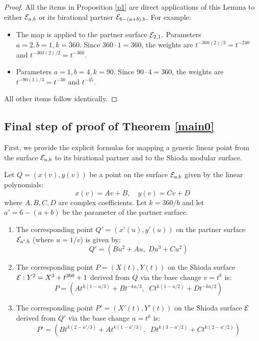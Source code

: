 \documentclass[11pt]{amsart}
\begin{document}
\begin{proof}
 All the items in Proposition \ref{p1} are direct applications of this Lemma to either ${\mathcal E}_{a,b}$ or its birational partner ${\mathcal E}_{6-(a+b),b}$. For example:
\begin{itemize}
	\item[(1)]   The map is applied to the partner surface ${\mathcal E}_{2,1}$. Parameters $a=2, b=1, k=360$. Since $360 \cdot 1 = 360$, the weights are $t^{-360(2)/3} = t^{-240}$ and $t^{-360(2)/2} = t^{-360}$.
		\item[(5)]   Parameters $a=1, b=4, k=90$. Since $90 \cdot 4 = 360$, the weights are $t^{-90(1)/3} = t^{-30}$ and $t^{-45}$.
\end{itemize}
All other items follow identically.
\end{proof}



 
\subsection{Final step of proof of Theorem \ref{main0}}


First, we provide the explicit formulas for mapping a generic linear point from the surface ${\mathcal E}_{a,b}$ to its birational partner and to the Shioda modular surface.

\begin{lema}
	\label{lem:linear_transform}
	Let $Q = (x(v), y(v))$ be a point on the surface ${\mathcal E}_{a,b}$ given by the linear polynomials:
	\[ x(v) = A v + B, \quad y(v) = C v + D \]
	where $A, B, C, D$ are complex coefficients. Let $k = 360/b$ and let $a' = 6-(a+b)$ be the parameter of the partner surface.
	
	\begin{enumerate}
		\item[(i)]  The corresponding point $Q'=(x'(u), y'(u))$ on the partner surface ${\mathcal E}_{a', b}$ (where $u=1/v$) is given by:
		\[ Q' = (B u^2 + A u, \; D u^3 + C u^2) \]
		
		\item[(ii)]  The corresponding point $P=(X(t), Y(t))$ on the Shioda surface ${\mathcal E}: Y^2 = X^3 + t^{360} + 1$ derived from $Q$ via the base change $v=t^k$ is:
		\[ P = \left( A t^{k(1 - a/3)} + B t^{-ka/3}, \;\; C t^{k(1 - a/2)} + D t^{-ka/2} \right) \]
		
		\item[(iii)] The corresponding point $P'=(X'(t), Y'(t))$ on the Shioda surface ${\mathcal E}$ derived from $Q'$ via the base change $u=t^k$ is:
		\[ P' = \left( B t^{k(2 - a'/3)} + A t^{k(1 - a'/3)}, \;\; D t^{k(3 - a'/2)} + C t^{k(2 - a'/2)} \right) \]
	\end{enumerate}
\end{lema}
\end{document}
